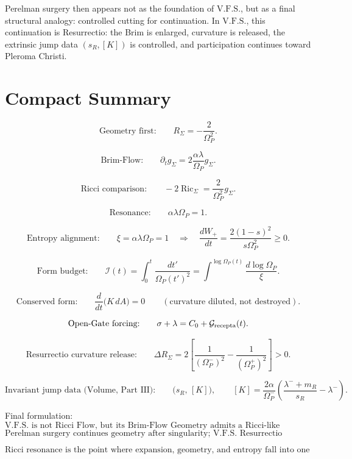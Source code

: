 \documentclass[11pt]{article}
\newcommand{\VFS}{\ensuremath{\mathrm{V.F.S.}}}
\newcommand{\Ric}{\operatorname{Ric}}
\newcommand{\Grec}{\mathcal G_{\rm recepta}}
\begin{document}
Perelman surgery then appears not as the foundation of \VFS{}, but as a final structural analogy: controlled cutting for continuation. In \VFS{}, this continuation is Resurrectio: the Brim is enlarged, curvature is released, the extrinsic jump data \((s_R,[K])\) is controlled, and participation continues toward Pleroma Christi.

\section*{Compact Summary}

\[
\text{Geometry first:}
\qquad
R_{\Sigma}=-\frac{2}{\Omega_P^2}.
\]

\[
\text{Brim-Flow:}
\qquad
\partial_tg_{\Sigma}
=
2\frac{\alpha\lambda}{\Omega_P}g_{\Sigma}.
\]

\[
\text{Ricci comparison:}
\qquad
-2\Ric_{\Sigma}
=
\frac{2}{\Omega_P^2}g_{\Sigma}.
\]

\[
\text{Resonance:}
\qquad
\alpha\lambda\Omega_P=1.
\]

\[
\text{Entropy alignment:}
\qquad
\xi=\alpha\lambda\Omega_P=1
\quad\Longrightarrow\quad
\frac{dW_+}{dt}=\frac{2(1-s)^2}{s\Omega_P^2}\ge0.
\]

\[
\text{Form budget:}
\qquad
\mathcal I(t)=\int_0^t\frac{dt'}{\Omega_P(t')^2}
=\int^{\log\Omega_P(t)}\frac{d\log\Omega_P}{\xi}.
\]

\[
\text{Conserved form:}
\qquad
\frac{d}{dt}\bigl(K\,dA\bigr)=0
\qquad
(\text{curvature diluted, not destroyed}).
\]

\[
\text{Open-Gate forcing:}
\qquad
\sigma+\lambda=C_0+\Grec(t).
\]

\[
\text{Resurrectio curvature release:}
\qquad
\Delta R_{\Sigma}
=
2\left[
\frac{1}{(\Omega_P^-)^2}
-
\frac{1}{(\Omega_P^+)^2}
\right]>0.
\]

\[
\text{Invariant jump data (Volume, Part III):}
\qquad
\bigl(s_R,\,[K]\bigr),
\qquad
[K]=\frac{2\alpha}{\Omega_P^-}
\left(\frac{\lambda^-+m_R}{s_R}-\lambda^-\right).
\]

Final formulation:
\[
\text{V.F.S. is not Ricci Flow, but its Brim-Flow Geometry admits a Ricci-like comparison.}
\]
\[
\text{Perelman surgery continues geometry after singularity; V.F.S. Resurrectio continues participation after death-like closure.}
\]

\[
\text{Ricci resonance is the point where expansion, geometry, and entropy fall into one rhythm.}
\]
\end{document}
